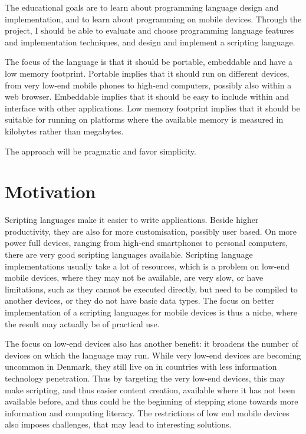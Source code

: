 \documentclass[11pt]{report}
\begin{document}
\begin{comment}
The motivation is that a scripting language makes it is easier to make applications for mobile 
devices, and that existing freely available scripting languages
are very limited, slow, or simply does not run on the low-end mobile devices.
\end{comment}

    The educational goals are to learn about programming language design and
implementation, and to learn about programming on mobile devices. Through the
project, I should be able to evaluate and choose programming language features
and implementation techniques, and design and implement a scripting language.

    The focus of the language is that it should be portable, embeddable and have
a low memory footprint. Portable implies that it should run on different devices,
from very low-end mobile phones to high-end computers, possibly also within a web browser. 
Embeddable implies that it should be easy to include within and interface with
other applications. Low memory footprint implies that it should be suitable for
running on platforms where the available memory is measured in kilobytes rather
than megabytes. 

    The approach will be pragmatic and favor simplicity.

\section{Motivation}

Scripting languages make it easier to write applications\cite{scripting-ousterhout}. Beside higher productivity, they are also for more customisation, possibly user based.
On more power full devices, ranging from high-end smartphones to personal computers, there are very good scripting languages available.
Scripting language implementations usually take a lot of resources, which is a problem on low-end mobile devices, where they may not be available, are very slow, or have limitations, such as they cannot be executed directly, but need to be compiled to another devices, or they do not have basic data types.
The focus on better implementation of a scripting languages for mobile devices is thus a niche, where the result may actually be of practical use.

The focus on low-end devices also has another benefit:
it broadens the number of devices on which the language may run.
While very low-end devices are becoming uncommon in Denmark,
they still live on in countries with less information technology penetration.
Thus by targeting the very low-end devices, 
this may make scripting, and thus easier content creation,
available where it has not been available before,
and thus could be the beginning of stepping stone 
towards more information and computing literacy.
The restrictions of low end mobile devices also imposes challenges, that may lead to interesting solutions.
\end{document}
